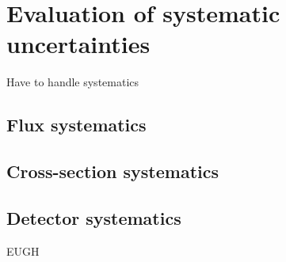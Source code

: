 


\chapter{Evaluation of systematic uncertainties}
\label{chap:SystematicEvaluation}
Have to handle systematics

\section{Flux systematics}
\label{sec:FluxSystematic}

\section{Cross-section systematics}
\label{sec:CrossSectionSystematics}

\section{Detector systematics}
\label{sec:DetectorSystematics}
EUGH

